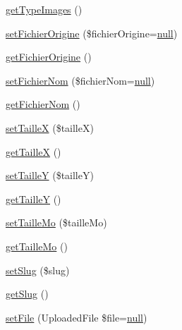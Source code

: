 \begin{DoxyCompactItemize}
\item 
\hyperlink{class_acme_group_1_1_labo_bundle_1_1_entity_1_1image_a113f5efb7276b40ac1fc8f924366b506}{get\+Type\+Images} ()
\item 
\hyperlink{class_acme_group_1_1_labo_bundle_1_1_entity_1_1image_aee0e303d84679639378c3da98e8a455b}{set\+Fichier\+Origine} (\$fichier\+Origine=\hyperlink{validate_8js_afb8e110345c45e74478894341ab6b28e}{null})
\item 
\hyperlink{class_acme_group_1_1_labo_bundle_1_1_entity_1_1image_a32a6fd707686f9df3fc20ee82d479800}{get\+Fichier\+Origine} ()
\item 
\hyperlink{class_acme_group_1_1_labo_bundle_1_1_entity_1_1image_a9f0474ae39b256b9de2bc6c20ce6aaf5}{set\+Fichier\+Nom} (\$fichier\+Nom=\hyperlink{validate_8js_afb8e110345c45e74478894341ab6b28e}{null})
\item 
\hyperlink{class_acme_group_1_1_labo_bundle_1_1_entity_1_1image_ab14a3977a9733bfdc0c94807b6109b6a}{get\+Fichier\+Nom} ()
\item 
\hyperlink{class_acme_group_1_1_labo_bundle_1_1_entity_1_1image_abc903202398c62a03c34d5a0661012b9}{set\+Taille\+X} (\$taille\+X)
\item 
\hyperlink{class_acme_group_1_1_labo_bundle_1_1_entity_1_1image_a2d0249f078eabc28b3b4227311a0374a}{get\+Taille\+X} ()
\item 
\hyperlink{class_acme_group_1_1_labo_bundle_1_1_entity_1_1image_a3399f0628e506642ba6b1c290480a088}{set\+Taille\+Y} (\$taille\+Y)
\item 
\hyperlink{class_acme_group_1_1_labo_bundle_1_1_entity_1_1image_aec1b2d77f94cbaad51ca60b21633f64d}{get\+Taille\+Y} ()
\item 
\hyperlink{class_acme_group_1_1_labo_bundle_1_1_entity_1_1image_af98d93cc439fee7d0b008d72741c80ed}{set\+Taille\+Mo} (\$taille\+Mo)
\item 
\hyperlink{class_acme_group_1_1_labo_bundle_1_1_entity_1_1image_accf86739285a69f685ed467360b87458}{get\+Taille\+Mo} ()
\item 
\hyperlink{class_acme_group_1_1_labo_bundle_1_1_entity_1_1image_a61bcd684c37c1715f402032434a3b6b0}{set\+Slug} (\$slug)
\item 
\hyperlink{class_acme_group_1_1_labo_bundle_1_1_entity_1_1image_ab0c59b8f49e2c4fdfa65ac3fc5dc002a}{get\+Slug} ()
\item 
\hyperlink{class_acme_group_1_1_labo_bundle_1_1_entity_1_1image_ac0b3faa43a5c7bb7821bc0c5c47acd6d}{set\+File} (Uploaded\+File \$file=\hyperlink{validate_8js_afb8e110345c45e74478894341ab6b28e}{null})

\end{DoxyCompactItemize}
